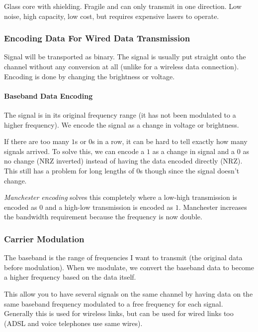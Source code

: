 Glass core with shielding.
Fragile and can only transmit in one direction.
Low noise, high capacity, low cost, but requires expensive lasers to operate.

\subsubsection{Encoding Data For Wired Data Transmission}\label{ssub:encoding_data_for_wired_data_transmission}

Signal will be transported as binary.
The signal is usually put straight onto the channel without any conversion at all (unlike for a wireless data connection).
Encoding is done by changing the brightness or voltage.

\paragraph{Baseband Data Encoding}\label{par:baseband_data_encoding}

The signal is in its original frequency range (it has not been modulated to a higher frequency).
We encode the signal as a change in voltage or brightness.

If there are too many \(1\)s or \(0\)s in a row, it can be hard to tell exactly how many signals arrived.
To solve this, we can encode a \(1\) as a change in signal and a \(0\) as no change (NRZ inverted) instead of having the data encoded directly (NRZ).
This still has a problem for long lengths of \(0\)s though since the signal doesn't change.

\emph{Manchester encoding} solves this completely where a low-high transmission is encoded as \(0\) and a high-low transmission is encoded as \(1\).
Manchester increases the bandwidth requirement because the frequency is now double.

\subsubsection{Carrier Modulation}\label{ssub:carrier_modulation}

The baseband is the range of frequencies I want to transmit (the original data before modulation).
When we modulate, we convert the baseband data to become a higher frequency based on the data itself.

This allow you to have several signals on the same channel by having data on the same baseband frequency modulated to a free frequency for each signal.
Generally this is used for wireless links, but can be used for wired links too (ADSL and voice telephones use same wires).

